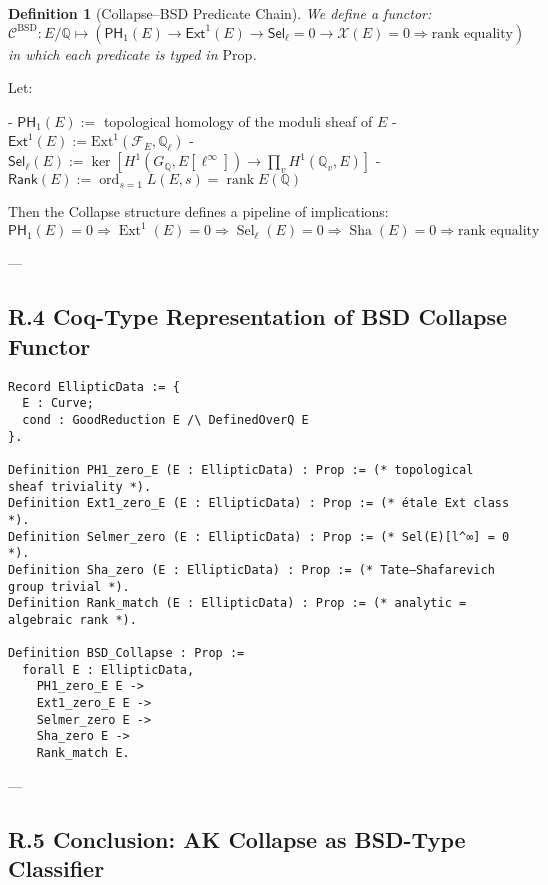 \documentclass[11pt]{article}
\newtheorem{definition}[theorem]{Definition}
\newcommand{\Sha}{\mathcal{X}}
\begin{document}
\begin{definition}[Collapse–BSD Predicate Chain]
We define a functor:
\[
\mathcal{C}^{\mathrm{BSD}} : E/\mathbb{Q} \mapsto \left(
\mathsf{PH}_1(E) \to \mathsf{Ext}^1(E) \to \mathsf{Sel}_\ell = 0 \to \Sha(E) = 0 \Rightarrow \text{rank equality}
\right)
\]
in which each predicate is typed in \( \mathrm{Prop} \).
\end{definition}

Let:

- \( \mathsf{PH}_1(E) := \) topological homology of the moduli sheaf of \( E \)
- \( \mathsf{Ext}^1(E) := \mathrm{Ext}^1(\mathcal{F}_E, \mathbb{Q}_\ell) \)
- \( \mathsf{Sel}_\ell(E) := \ker[ H^1(G_\mathbb{Q}, E[\ell^\infty]) \to \prod_v H^1(\mathbb{Q}_v, E) ] \)
- \( \mathsf{Rank}(E) := \operatorname{ord}_{s=1} L(E,s) = \operatorname{rank} E(\mathbb{Q}) \)

Then the Collapse structure defines a pipeline of implications:
\[
\mathsf{PH}_1(E) = 0
\Rightarrow \operatorname{Ext}^1(E) = 0
\Rightarrow \operatorname{Sel}_\ell(E) = 0
\Rightarrow \operatorname{Sha}(E) = 0
\Rightarrow \text{rank equality}
\]

---

\subsection*{R.4 Coq-Type Representation of BSD Collapse Functor}

\begin{verbatim}
Record EllipticData := {
  E : Curve;
  cond : GoodReduction E /\ DefinedOverQ E
}.

Definition PH1_zero_E (E : EllipticData) : Prop := (* topological sheaf triviality *).
Definition Ext1_zero_E (E : EllipticData) : Prop := (* étale Ext class *).
Definition Selmer_zero (E : EllipticData) : Prop := (* Sel(E)[l^∞] = 0 *).
Definition Sha_zero (E : EllipticData) : Prop := (* Tate–Shafarevich group trivial *).
Definition Rank_match (E : EllipticData) : Prop := (* analytic = algebraic rank *).

Definition BSD_Collapse : Prop :=
  forall E : EllipticData,
    PH1_zero_E E ->
    Ext1_zero_E E ->
    Selmer_zero E ->
    Sha_zero E ->
    Rank_match E.
\end{verbatim}

---

\subsection*{R.5 Conclusion: AK Collapse as BSD-Type Classifier}
\end{document}
